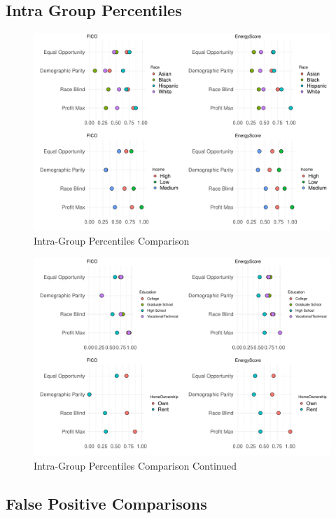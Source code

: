 \documentclass[11pt,]{article}
\begin{document}
\hypertarget{intra-group-percentiles}{%
\subsection{Intra Group Percentiles}\label{intra-group-percentiles}}

\begin{figure}
\centering
\includegraphics{figs/intra.pdf}
\caption{\label{fig:intra}Intra-Group Percentiles Comparison}
\end{figure}

\begin{figure}
\centering
\includegraphics{figs/intra2.pdf}
\caption{\label{fig:intra2}Intra-Group Percentiles Comparison Continued}
\end{figure}

\hypertarget{false-positive-comparisons}{%
\subsection{False Positive
Comparisons}\label{false-positive-comparisons}}
\end{document}
